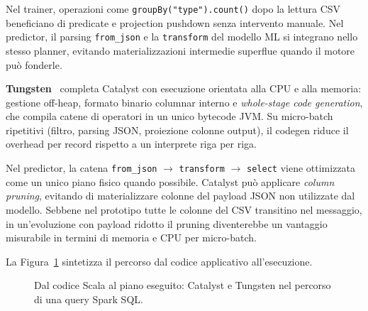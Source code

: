 Nel trainer, operazioni come \texttt{groupBy("type").count()} dopo la lettura CSV beneficiano di predicate e projection pushdown senza intervento manuale.
Nel predictor, il parsing \texttt{from\_json} e la \texttt{transform} del modello ML si integrano nello stesso planner, evitando materializzazioni intermedie superflue quando il motore può fonderle.

\textbf{Tungsten}~\cite{neumann2011efficiently} completa Catalyst con esecuzione orientata alla CPU e alla memoria: gestione off-heap, formato binario columnar interno e \emph{whole-stage code generation}, che compila catene di operatori in un unico bytecode JVM.
Su micro-batch ripetitivi (filtro, parsing JSON, proiezione colonne output), il codegen riduce il overhead per record rispetto a un interprete riga per riga.

Nel predictor, la catena \texttt{from\_json} $\rightarrow$ \texttt{transform} $\rightarrow$ \texttt{select} viene ottimizzata come un unico piano fisico quando possibile.
Catalyst può applicare \emph{column pruning}, evitando di materializzare colonne del payload JSON non utilizzate dal modello.
Sebbene nel prototipo tutte le colonne del CSV transitino nel messaggio, in un'evoluzione con payload ridotto il pruning diventerebbe un vantaggio misurabile in termini di memoria e CPU per micro-batch.

La Figura~\ref{fig:spark-query-flow} sintetizza il percorso dal codice applicativo all'esecuzione.

\begin{figure}[H]
  \centering
  \caption{Dal codice Scala al piano eseguito: Catalyst e Tungsten nel percorso di una query Spark SQL.}
  \label{fig:spark-query-flow}
\end{figure}

